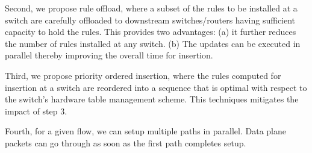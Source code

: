 Second, we propose rule offload, where a subset of the rules to be installed at
a switch are carefully offloaded to downstream switches/routers having
sufficient capacity to hold the rules. This provides two advantages: (a) it
further reduces the number of rules installed at any switch. (b) The updates can
be executed in parallel thereby improving the overall time for insertion. 

Third, we propose priority ordered insertion, where the rules computed for
insertion at a switch are reordered into a sequence that is optimal with respect
to the switch's hardware table management scheme. This techniques mitigates the impact
of step 3. 

Fourth, for a given flow, we can setup multiple paths in parallel. Data plane
packets can go through as soon as the first path completes setup.
\fi
